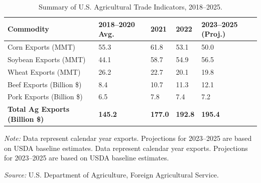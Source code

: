 \begin{table}[htpb!] %
\centering
\begin{threeparttable}
\captionsetup{justification=raggedright,singlelinecheck=true}
\caption{Summary of U.S. Agricultural Trade Indicators, 2018–2025.}
\label{tab:trade_summary}
\small


\begin{tabular}{L{4.2cm} C{2.5cm} C{2.2cm} C{2.2cm} C{3.0cm}}
\toprule
{}
{\color{white}\bfseries Commodity} &
{\color{white}\bfseries 2018--2020 Avg.} &
{\color{white}\bfseries 2021} &
{\color{white}\bfseries 2022} &
{\color{white}\bfseries 2023--2025 (Proj.)} \\
\midrule
Corn Exports (MMT) & 55.3 & 61.8 & 53.1 & 50.0 \\
Soybean Exports (MMT) & 44.1 & 58.7 & 54.9 & 56.5 \\
Wheat Exports (MMT) & 26.2 & 22.7 & 20.1 & 19.8 \\
Beef Exports (Billion \$) & 8.4 & 10.7 & 11.3 & 12.1 \\
Pork Exports (Billion \$) & 6.5 & 7.8 & 7.4 & 7.2 \\
\midrule
\textbf{Total Ag Exports (Billion \$)} & \textbf{145.2} & \textbf{177.0} & \textbf{192.8} & \textbf{195.4} \\
\bottomrule
\end{tabular}


\vspace{1.5pt}
\begin{tablenotes}[flushleft]
\footnotesize
\setlength{\leftmargin}{0pt}      %
\setlength{\labelsep}{0pt}        %
\setlength{\itemsep}{4pt}         %
\setlength{\parsep}{0pt}          %
\setlength{\parindent}{0pt}       %
\item\textit{Note:} Data represent calendar year exports. Projections for 2023–2025 are based on USDA baseline estimates. Data represent calendar year exports. Projections for 2023–2025 are based on USDA baseline estimates.\par
\item\textit{Source:} U.S. Department of Agriculture, Foreign Agricultural Service.
\end{tablenotes}
\end{threeparttable}
\end{table}